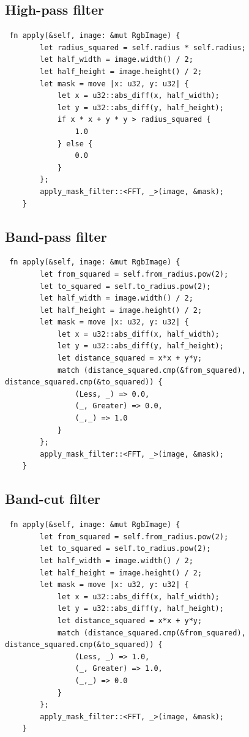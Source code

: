 \documentclass[12pt]{article}
\begin{document}
\subsection{High-pass filter}
\begin{lstlisting}
 fn apply(&self, image: &mut RgbImage) {
        let radius_squared = self.radius * self.radius;
        let half_width = image.width() / 2;
        let half_height = image.height() / 2;
        let mask = move |x: u32, y: u32| {
            let x = u32::abs_diff(x, half_width);
            let y = u32::abs_diff(y, half_height);
            if x * x + y * y > radius_squared {
                1.0
            } else {
                0.0
            }
        };
        apply_mask_filter::<FFT, _>(image, &mask);
    }
\end{lstlisting}
\subsection{Band-pass filter}
\begin{lstlisting}
 fn apply(&self, image: &mut RgbImage) {
        let from_squared = self.from_radius.pow(2);
        let to_squared = self.to_radius.pow(2);
        let half_width = image.width() / 2;
        let half_height = image.height() / 2;
        let mask = move |x: u32, y: u32| {
            let x = u32::abs_diff(x, half_width);
            let y = u32::abs_diff(y, half_height);
            let distance_squared = x*x + y*y;
            match (distance_squared.cmp(&from_squared), distance_squared.cmp(&to_squared)) {
                (Less, _) => 0.0,
                (_, Greater) => 0.0,
                (_,_) => 1.0
            }
        };
        apply_mask_filter::<FFT, _>(image, &mask);
    }
\end{lstlisting}
\subsection{Band-cut filter}
\begin{lstlisting}
 fn apply(&self, image: &mut RgbImage) {
        let from_squared = self.from_radius.pow(2);
        let to_squared = self.to_radius.pow(2);
        let half_width = image.width() / 2;
        let half_height = image.height() / 2;
        let mask = move |x: u32, y: u32| {
            let x = u32::abs_diff(x, half_width);
            let y = u32::abs_diff(y, half_height);
            let distance_squared = x*x + y*y;
            match (distance_squared.cmp(&from_squared), distance_squared.cmp(&to_squared)) {
                (Less, _) => 1.0,
                (_, Greater) => 1.0,
                (_,_) => 0.0
            }
        };
        apply_mask_filter::<FFT, _>(image, &mask);
    }
\end{lstlisting}
\end{document}
